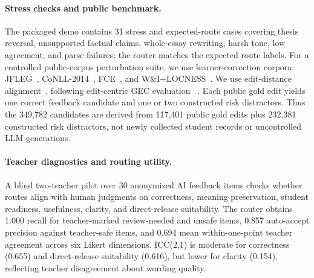 \documentclass[11pt]{article}
\begin{document}
\paragraph{Stress checks and public benchmark.}
The packaged demo contains 31 stress and expected-route cases covering thesis
reversal, unsupported factual claims, whole-essay rewriting, harsh tone, low
agreement, and parse failures; the router matches the expected route labels. For
a controlled public-corpus perturbation suite, we use learner-correction corpora:
JFLEG~\cite{napoles-etal-2017-jfleg}, CoNLL-2014~\cite{ng-etal-2014-conll},
FCE~\cite{yannakoudakis2011fce}, and W\&I+LOCNESS~\cite{bryant-etal-2019-bea}.
We use edit-distance alignment~\cite{levenshtein1966binary}, following
edit-centric GEC evaluation
~\cite{dahlmeier-ng-2012-better,bryant-etal-2017-automatic}. Each public gold
edit yields one correct feedback candidate and one or two constructed risk
distractors. Thus the 349,782 candidates are derived from 117,401 public gold
edits plus 232,381 constructed risk distractors, not newly collected student
records or uncontrolled LLM generations.

\begin{table}[t]
\centering
\scriptsize
{}
\caption{Public learner-corpus routing benchmark. Candidate counts are derived
from public gold edits: each edit contributes one correct candidate and one or
two constructed risk distractors.}
\label{tab:public}
\end{table}

\paragraph{Teacher diagnostics and routing utility.}
A blind two-teacher pilot over 30 anonymized AI feedback items checks whether
routes align with human judgments on correctness, meaning preservation, student
readiness, usefulness, clarity, and direct-release suitability. The router
obtains 1.000 recall for teacher-marked review-needed and unsafe items, 0.857
auto-accept precision against teacher-safe items, and 0.694 mean
within-one-point teacher agreement across six Likert dimensions. ICC(2,1) is
moderate for correctness (0.655) and direct-release suitability (0.616), but
lower for clarity (0.154), reflecting teacher disagreement about wording
quality.
\end{document}
